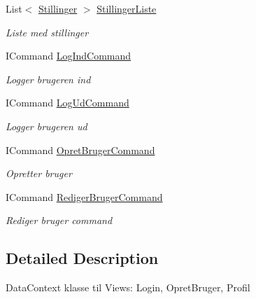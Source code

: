 \begin{DoxyCompactItemize}
List$<$ \hyperlink{class__1aarsproeve_1_1_model_1_1_stillinger}{Stillinger} $>$ \hyperlink{class__1aarsproeve_1_1_view_model_1_1_bruger_view_model_ac5c316878e65e35da6706ecf6623a864}{Stillinger\+Liste}
\begin{DoxyCompactList}\small\item\em Liste med stillinger \end{DoxyCompactList}\item 
I\+Command \hyperlink{class__1aarsproeve_1_1_view_model_1_1_bruger_view_model_a40fed761861b9387bc47a92a2f1e55fd}{Log\+Ind\+Command}
\begin{DoxyCompactList}\small\item\em Logger brugeren ind \end{DoxyCompactList}\item 
I\+Command \hyperlink{class__1aarsproeve_1_1_view_model_1_1_bruger_view_model_afc1d332a62edcc717d3e1764db42c89a}{Log\+Ud\+Command}
\begin{DoxyCompactList}\small\item\em Logger brugeren ud \end{DoxyCompactList}\item 
I\+Command \hyperlink{class__1aarsproeve_1_1_view_model_1_1_bruger_view_model_aa395aa2d3e7893d91fa9420ca66aa5b3}{Opret\+Bruger\+Command}
\begin{DoxyCompactList}\small\item\em Opretter bruger \end{DoxyCompactList}\item 
I\+Command \hyperlink{class__1aarsproeve_1_1_view_model_1_1_bruger_view_model_accb519586a3211fdc24e064d17460cf3}{Rediger\+Bruger\+Command}
\begin{DoxyCompactList}\small\item\em Rediger bruger command \end{DoxyCompactList}\end{DoxyCompactItemize}


\subsection{Detailed Description}
Data\+Context klasse til Views\+: Login, Opret\+Bruger, Profil 



